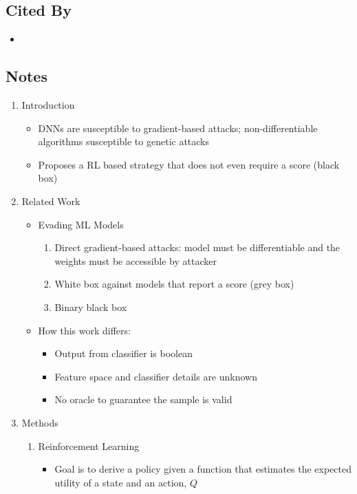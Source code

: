 \documentclass{article}
\begin{document}
\subsection*{Cited By}
\begin{itemize}
	\item
\end{itemize}

\subsection*{Notes}

\begin{enumerate}
	\item Introduction
	\begin{itemize}
		\item DNNs are susceptible to gradient-based attacks; non-differentiable algorithms susceptible to genetic attacks
		\item Proposes a RL based strategy that does not even require a score (black box)
	\end{itemize}
	\item Related Work
	\begin{itemize}
		\item Evading ML Models
		\begin{enumerate}
			\item Direct gradient-based attacks: model must be differentiable and the weights must be accessible by attacker
			\item White box against models that report a score (grey box)
			\item Binary black box
		\end{enumerate}
		\item How this work differs:
		\begin{itemize}
			\item Output from classifier is boolean
			\item Feature space and classifier details are unknown
			\item No oracle to guarantee the sample is valid
		\end{itemize}
	\end{itemize}
	\item Methods
	\begin{enumerate}
		\item Reinforcement Learning
		\begin{itemize}
			\item Goal is to derive a policy given a function that estimates the expected utility of a state and an action, $Q$

\end{itemize}
\end{enumerate}
\end{enumerate}
\end{document}
